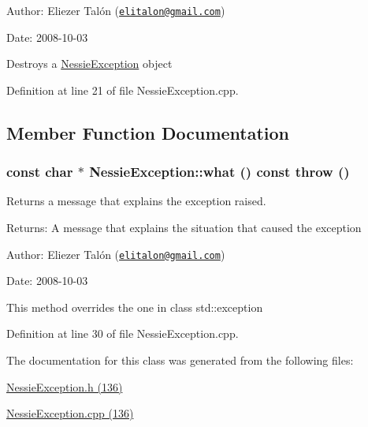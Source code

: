 \begin{Desc}
\item[Author:]Eliezer Talón (\href{mailto:elitalon@gmail.com}{\tt elitalon@gmail.com}) \end{Desc}
\begin{Desc}
\item[Date:]2008-10-03\end{Desc}
Destroys a \hyperlink{class_nessie_exception}{NessieException} object 

Definition at line 21 of file NessieException.cpp.

\subsection{Member Function Documentation}
\hypertarget{class_nessie_exception_a522c2ea164e88be0b26670170b33909}{
\subsubsection[what]{\setlength{\rightskip}{0pt plus 5cm}const char $\ast$ NessieException::what () const  throw ()}}
\label{class_nessie_exception_a522c2ea164e88be0b26670170b33909}


Returns a message that explains the exception raised. 

\begin{Desc}
\item[Returns:]A message that explains the situation that caused the exception\end{Desc}
\begin{Desc}
\item[Author:]Eliezer Talón (\href{mailto:elitalon@gmail.com}{\tt elitalon@gmail.com}) \end{Desc}
\begin{Desc}
\item[Date:]2008-10-03\end{Desc}
This method overrides the one in class std::exception 

Definition at line 30 of file NessieException.cpp.

The documentation for this class was generated from the following files:\begin{CompactItemize}
\item 
\hyperlink{_nessie_exception_8h}{NessieException.h (136)}\item 
\hyperlink{_nessie_exception_8cpp}{NessieException.cpp (136)}\end{CompactItemize}
